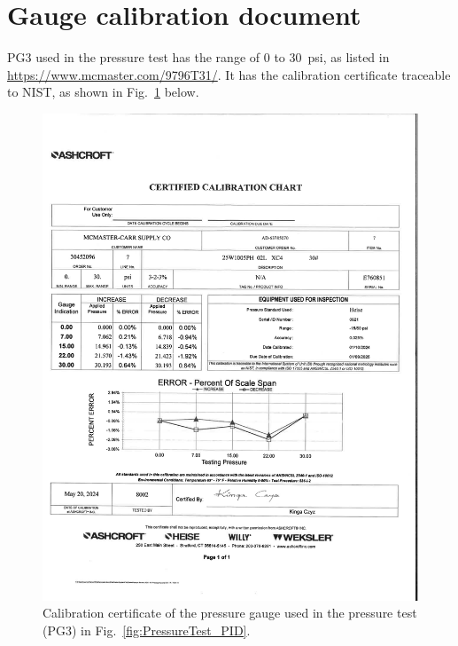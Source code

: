 \documentclass[letterpaper,11pt]{article}
\begin{document}
\section{Gauge calibration document}

PG3 used in the pressure test has the range of 0 to 30~psi, as listed in
\url{https://www.mcmaster.com/9796T31/}.
It has the calibration certificate traceable to NIST, as shown in Fig.~\ref{fig:PG3Certificate} below.

\begin{figure}[h]
    \centering
    \includegraphics[width=\textwidth]{form/gauge_calibration_cert.pdf}
    \caption{Calibration certificate of the pressure gauge used in the pressure test (PG3) in 
    Fig.~\ref{fig:PressureTest_PID}.}
    \label{fig:PG3Certificate}
\end{figure}


\end{document}
